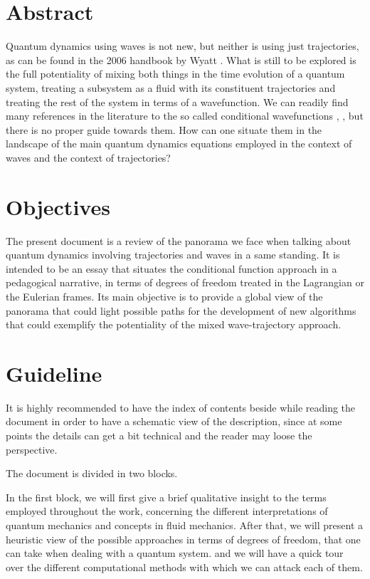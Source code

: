 \documentclass[11pt, a4paper]{article} %
\begin{document}
%
\pagestyle{empty}

\section*{Abstract}
Quantum dynamics using waves is not new, but neither is using just trajectories, as can be found in the 2006 handbook by Wyatt \cite{Wyatt}. What is still to be explored is the full potentiality of mixing both things in the time evolution of a quantum system, treating a subsystem as a fluid with its constituent trajectories and treating the rest of the system in terms of a wavefunction. We can readily find many references in the literature to the so called conditional wavefunctions \cite{conditional1}, \cite{conditional2}, but there is no proper guide towards them. How can one situate them in the landscape of the main quantum dynamics equations employed in the context of waves and the context of trajectories?



\section*{Objectives}\vspace{-0.2cm}
The present document is a review of the panorama we face when talking about quantum dynamics involving trajectories and waves in a same standing. It is intended to be an essay that situates the conditional function approach in a pedagogical narrative, in terms of degrees of freedom treated in the Lagrangian or the Eulerian frames. Its main objective is to provide a global view of the panorama that could light possible paths for the development of new algorithms that could exemplify the potentiality of the mixed wave-trajectory approach.


\section*{Guideline}\vspace{-0.2cm}

It is highly recommended to have the index of contents beside while reading the document in order to have a schematic view of the description, since at some points the details can get a bit technical and the reader may loose the perspective.

The document is divided in two blocks.

 In the first block, we will first give a brief qualitative insight to the terms employed throughout the work, concerning the different interpretations of quantum mechanics and concepts in fluid mechanics. After that, we will present a heuristic view of the possible approaches in terms of degrees of freedom, that one can take when dealing with a quantum system. and we will have a quick tour over the different computational methods with which we can attack each of them. 
\end{document}
